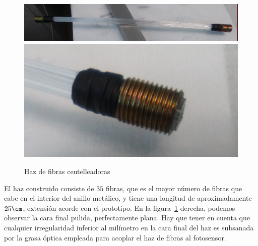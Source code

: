 \begin{figure}[htb]
\centering
{
\includegraphics[scale=0.33]{bunchfibras.png} 
}
{
\includegraphics[scale=0.33]{bunchfibras1.png} 
}
\caption{Haz de fibras centelleadoras\label{Bunch}}
\end{figure} 

El haz  construido consiste de $35$ fibras, que es el mayor número de fibras que cabe en el interior del anillo metálico, y tiene una longitud de aproximadamente $25\cm$, extensión acorde con el prototipo. En la figura~\ref{Bunch} derecha, podemos observar la cara final pulida, perfectamente plana. Hay que tener en cuenta que cualquier irregularidad inferior al milímetro en la cara final del haz es subsanada por la grasa óptica empleada para acoplar el haz de fibras al fotosensor.
